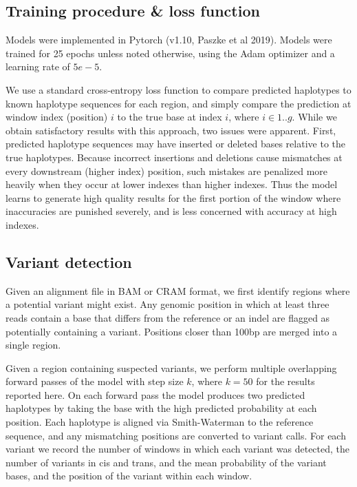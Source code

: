\documentclass[]{article}
\begin{document}
\subsection{Training procedure \& loss function}


Models were implemented in Pytorch (v1.10, Paszke et al 2019). Models were trained for 25 epochs unless noted otherwise, using the Adam optimizer and a learning rate of $5e-5$. 

We use a standard cross-entropy loss function to compare predicted haplotypes to known haplotype sequences for each region, and simply compare the prediction at window index (position) $i$ to the true base at index $i$, where $i \in 1..g$.  While we obtain satisfactory results with this approach, two issues were apparent. First, predicted haplotype sequences may have inserted or deleted bases relative to the true haplotypes. Because incorrect insertions and deletions cause mismatches at every downstream (higher index) position, such mistakes are penalized more heavily when they occur at lower indexes than higher indexes. Thus the model learns to generate high quality results for the first portion of the window where inaccuracies are punished severely, and is less concerned with accuracy at high indexes. 



\subsection{Variant detection}

Given an alignment file in BAM or CRAM format, we first identify regions where a potential variant might exist. Any genomic position in which at least three reads contain a base that differs from the reference or an indel are flagged as potentially containing a variant. Positions closer than 100bp are merged into a single region. 


Given a region containing suspected variants, we perform multiple overlapping forward passes of the model with step size $k$, where $k=50$ for the results reported here. On each forward pass the model produces two predicted haplotypes by taking the base with the high predicted probability at each position. Each haplotype is aligned via Smith-Waterman to the reference sequence, and any mismatching positions are converted to variant calls. For each variant we record the number of windows in which each variant was detected, the number of variants in cis and trans, and the mean probability of the variant bases, and the position of the variant within each window.   
\end{document}

